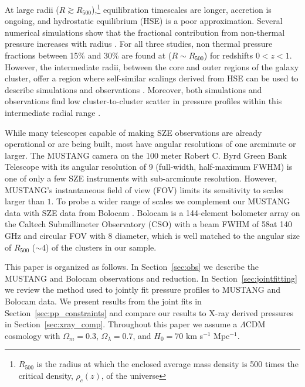 \documentclass[iop,numberedappendix,apj]{emulateapj}
\begin{document}
At large radii ($R \gtrsim R_{500}$),\footnote{$R_{500}$
is the radius at which the enclosed average mass density is 500 times the critical density, 
$\rho_c(z)$, of the universe} equilibration timescales are longer, accretion is ongoing, 
and hydrostatic equilibrium (HSE) is a poor approximation. 
Several numerical simulations show that the fractional contribution
 from non-thermal pressure increases with radius \citep{shaw2010,battaglia2012,nelson2014}. 
For all three studies, non thermal pressure fractions between 15\% and 30\% are found at ($R \sim R_{500}$)
for redshifts $0 < z < 1$. However, the intermediate radii, between the core and outer regions of the 
galaxy cluster, offer a region where self-similar scalings derived from HSE can be used to describe simulations 
and observations \citep[e.g.][]{kravtsov2012}. Moreover, both simulations and observations find low
cluster-to-cluster scatter in pressure profiles within this intermediate radial range \citep[e.g.][]{borgani2004,
nagai2007,arnaud2010,bonamente2012,planck2013a,sayers2013}.

While many telescopes capable of making SZE observations are already operational or are being built, most have
angular resolutions of one arcminute or larger. The MUSTANG camera \citep{dicker2008}
on the 100 meter Robert C. Byrd Green Bank Telescope \citep[GBT, ][]{jewell2004} with its angular resolution of 9\asec 
(full-width, half-maximum FWHM) is one of only a few SZE instruments with sub-arcminute resolution.
However, MUSTANG's instantaneous field of view (FOV) limits its sensitivity to scales larger than $1$\amin. 
To probe a wider range of scales we complement our MUSTANG data with SZE data from Bolocam \citep{glenn1998}. 
Bolocam is a 144-element bolometer
array on the Caltech Submillimeter Observatory (CSO) with a beam FWHM of 58\asecs at 140 GHz and circular FOV with 8\amins 
diameter, which is well matched to the angular size of $R_{500}$ ($\sim 4$\amin) of the clusters in our sample. 

This paper is organized as follows. In Section~\ref{sec:obs} we describe the MUSTANG and Bolocam observations and reduction. 
In Section~\ref{sec:jointfitting} we review the method used to jointly fit pressure profiles to MUSTANG and Bolocam data. We
present results from the joint fits in Section~\ref{sec:pp_constraints} and compare our results to X-ray derived pressures 
in Section~\ref{sec:xray_comp}. 
Throughout this paper we assume a $\Lambda$CDM cosmology with $\Omega_m = 0.3$, $\Omega_{\lambda} = 0.7$, and $H_0 = 70$ 
km s$^{-1}$ Mpc$^{-1}$.
\end{document}
